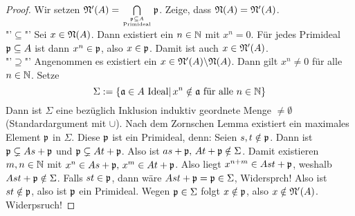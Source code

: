 \begin{proof}
	Wir setzen $\mathfrak{N}'(A)= \bigcap\limits_{\mathfrak{p} \subseteq A\atop \text{Primideal}} \mathfrak{p}$. Zeige, dass $\mathfrak{N}(A) = \mathfrak{N}'(A)$.\\
	"'$\subseteq$"' Sei $x\in \mathfrak{N}(A)$. Dann existiert ein $n\in \mathbb{N}$ mit $x^n=0$. Für jedes Primideal $\mathfrak{p}\subseteq A$ ist dann $x^n\in \mathfrak{p}$, also $x\in \mathfrak{p}$. Damit ist auch $x\in \mathfrak{N}'(A)$.\\
	"'$\supseteq$"' Angenommen es existiert ein $x\in \mathfrak{N}'(A) \backslash \mathfrak{N}(A)$. Dann gilt $x^n\neq 0$ für alle $n\in \mathbb{N}$. Setze
	$$\Sigma:= \{\mathfrak{a}\in A \text{ Ideal}|\, x^n\notin \mathfrak{a} \text{ für alle }n\in \mathbb{N}\}$$
	Dann ist $\Sigma$ eine bezüglich Inklusion induktiv geordnete Menge $\neq \emptyset$ (Standardargument mit $\cup$). Nach dem Zornschen Lemma existiert ein maximales Element $\mathfrak{p}$ in $\Sigma$. Diese $\mathfrak{p}$ ist ein Primideal, denn: Seien $s,t\notin \mathfrak{p}$. Dann ist $\mathfrak{p} \subsetneq As+ \mathfrak{p}$ und $\mathfrak{p}\subsetneq At+\mathfrak{p}$. Also ist $as+ \mathfrak{p}, \, At + \mathfrak{p} \notin\Sigma$. Damit existieren $m,n\in \mathbb{N}$ mit $x^n\in As+\mathfrak{p}, \, x^m \in At+ \mathfrak{p}$. Also liegt $x^{n+m} \in Ast+ \mathfrak{p}$, weshalb $Ast + \mathfrak{p} \notin\Sigma$. Falls $st \in \mathfrak{p}$, dann wäre $Ast + \mathfrak{p} = \mathfrak{p} \in \Sigma$, Widersprch! Also ist $st \notin \mathfrak{p}$, also ist $\mathfrak{p}$ ein Primideal. Wegen $\mathfrak{p} \in \Sigma$ folgt $x\notin \mathfrak{p}$, also $x\notin \mathfrak{N}'(A)$. Widerpsruch!
\end{proof}